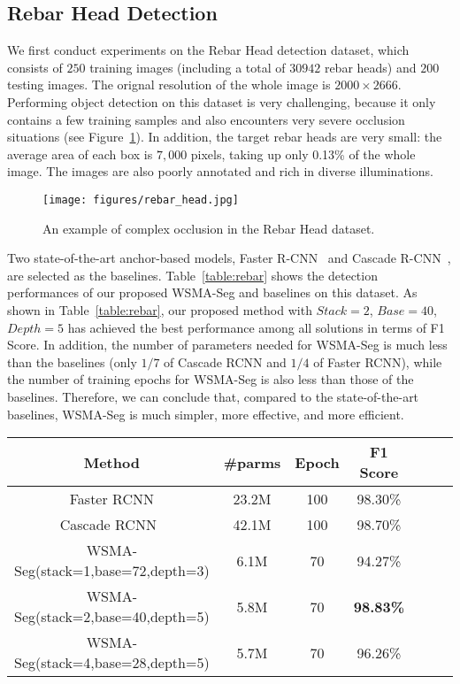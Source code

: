 \documentclass{article}
\begin{document}
\subsection{Rebar Head Detection}



We first conduct experiments on the Rebar Head detection dataset, which consists of $250$ training images (including a total of $30942$ rebar heads) and $200$ testing images. The orignal resolution of the whole image is $2000 \times 2666$. Performing object detection on this dataset is very challenging, because it only contains a few training samples  and also encounters very severe occlusion situations (see Figure~\ref{fig:rebar_example}). In addition, the target rebar heads are very small: the average area of each box is $7,000$ pixels, taking up only 0.13\% of the whole image. The images are also poorly annotated and rich in diverse illuminations. 


\begin{figure}[!t]
  \centering
  \texttt{[image: figures/rebar\_head.jpg]}
  \caption{An example of complex occlusion in the Rebar Head dataset.\label{fig:rebar_example}}
\end{figure}

Two state-of-the-art anchor-based models, Faster R-CNN~\cite{ren2015fasterrcnn} and Cascade R-CNN~\cite{cai2018cascade}, are selected as the baselines. Table~\ref{table:rebar} shows the detection performances of our proposed WSMA-Seg and baselines on this dataset.
As shown in Table~\ref{table:rebar}, our proposed method with $Stack=2$, $Base=40$, $Depth=5$ has achieved the best performance among all solutions in terms of F1 Score. In addition, the number of parameters needed for WSMA-Seg is much less than the baselines (only $1/7$ of Cascade RCNN and $1/4$ of Faster RCNN), while the number of training epochs for WSMA-Seg is also less than those of the baselines. Therefore, we can conclude that, compared to the state-of-the-art baselines, WSMA-Seg is much simpler, more effective, and more efficient.

\begin{table*}[!t]
  \caption{Detection performances of WSMA-Seg and baselines on the Rebar Head dataset.\label{table:rebar}}
  
  \smallskip 
  \centering
  \begin{tabular}{|c|c|c|c|c|c|c|}
  \hline
  Method&\#parms&Epoch&F1 Score\\ \hline
  Faster RCNN&23.2M&100&98.30\%\\\hline
  Cascade RCNN~\cite{cai2018cascade}&42.1M&100&98.70\%\\\hline
  WSMA-Seg(stack=1,base=72,depth=3)&6.1M&70&94.27\%\\\hline
  WSMA-Seg(stack=2,base=40,depth=5)&5.8M&70&\textbf{98.83\%}\\\hline
  WSMA-Seg(stack=4,base=28,depth=5)&5.7M&70&96.26\%\\\hline
  \end{tabular}
\end{table*}
\end{document}
